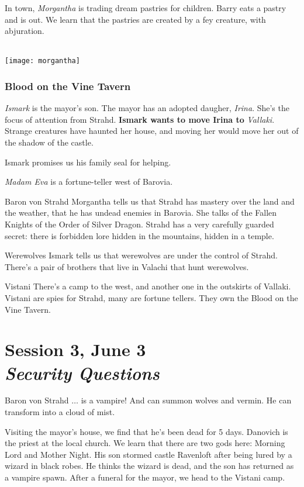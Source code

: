 \documentclass[10pt,twoside,twocolumn]{article}
\begin{document}
In town, \emph{Morgantha} is trading dream
pastries for children. Barry eats a pastry and is
out. We learn that the pastries are created by a fey creature, with abjuration.
\\\\
\centerline{\texttt{[image: morgantha]}}

\subsubsection{Blood on the Vine Tavern}
\textit{Ismark} is the mayor's son. The
mayor has an adopted daugher,
\textit{Irina}. She's the focus of attention
from Strahd. \textbf{Ismark wants to move Irina to }\emph{Vallaki}. Strange creatures
have haunted her house, and moving her would move her out of the
shadow of the castle.

Ismark promises us his family seal for helping.

\emph{Madam Eva} is a fortune-teller west of Barovia.

\begin{paperbox}{Baron von Strahd}
Morgantha tells us that Strahd has mastery over the land and the
weather, that he has undead enemies in Barovia. She talks of the
Fallen Knights of the Order of Silver Dragon. Strahd has a very carefully
guarded secret: there is forbidden lore hidden in the mountains,
hidden in a temple.
\end{paperbox}

\begin{paperbox}{Werewolves}
  Ismark tells us that werewolves are under the control of Strahd. There's a pair of brothers that live in Valachi that hunt werewolves.
\end{paperbox}

\begin{paperbox}{Vistani}
  There's a camp to the west, and another one in the outskirts of
  Vallaki. Vistani are spies for Strahd, many are fortune tellers. They
  own the Blood on the Vine Tavern.
\end{paperbox}
\clearpage
\section{Session 3, June 3\\\textit{Security Questions}}
\begin{paperbox}{Baron von Strahd}
  $\hdots$ is a vampire! And can summon wolves and vermin. He can transform into a cloud of mist.
\end{paperbox}
Visiting the mayor's house, we find that he's been dead for 5 days. Danovich is the priest at the local church. We learn that there are two gods here: Morning Lord and Mother Night. His son stormed castle Ravenloft after being lured by a wizard in black robes. He thinks the wizard is dead, and the son has returned as a vampire spawn. After a funeral for the mayor, we head to the Vistani camp.
\end{document}
